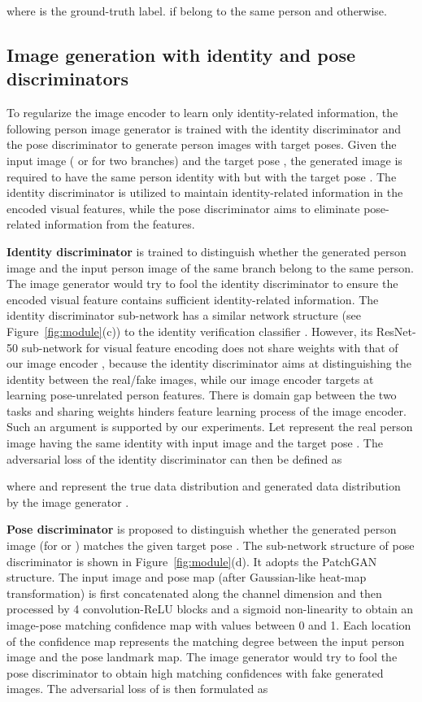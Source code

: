 \documentclass{article}
\begin{document}
where  is the ground-truth label.  if  belong to the same person and  otherwise.

\subsection{Image generation with identity and pose discriminators}
\label{sec:ad}

To regularize the image encoder  to learn only identity-related information, the following person image generator  is trained with the identity discriminator  and the pose discriminator  to generate person images with target poses. Given the input image  ( or  for two branches) and the target pose , the generated image  is required to have the same person identity with  but with the target pose . The identity discriminator is utilized to maintain identity-related information in the encoded visual features, while the pose discriminator aims to eliminate pose-related information from the features.

\textbf{Identity discriminator } is trained to distinguish whether the generated person image and the input person image of the same branch belong to the same person. The image generator would try to fool the identity discriminator to ensure the encoded visual feature contains sufficient identity-related information. The identity discriminator sub-network has a similar network structure (see Figure~\ref{fig:module}(c)) to the identity verification classifier . However, its ResNet-50 sub-network for visual feature encoding does not share weights with that of our image encoder , because the identity discriminator  aims at distinguishing the identity between the real/fake images, while our image encoder targets at learning pose-unrelated person features. There is domain gap between the two tasks and sharing weights hinders feature learning process of the image encoder. Such an argument is supported by our experiments. Let  represent the real person image having the same identity with input image  and the target pose . The adversarial loss of the identity discriminator  can then be defined as

where  and  represent the true data distribution and generated data distribution by the image generator . 

\textbf{Pose discriminator } is proposed to distinguish whether the generated person image  (for  or ) matches the given target pose . The sub-network structure of pose discriminator is shown in Figure~\ref{fig:module}(d). It adopts the PatchGAN~\cite{pix2pix} structure. The input image and pose map (after Gaussian-like heat-map transformation) is first concatenated along the channel dimension and then processed by 4 convolution-ReLU blocks and a sigmoid non-linearity to obtain an image-pose matching confidence map with values between 0 and 1. Each location of the confidence map represents the matching degree between the input person image and the pose landmark map. The image generator  would try to fool the pose discriminator  to obtain high matching confidences with fake generated images. The adversarial loss of  is then formulated as
\end{document}
